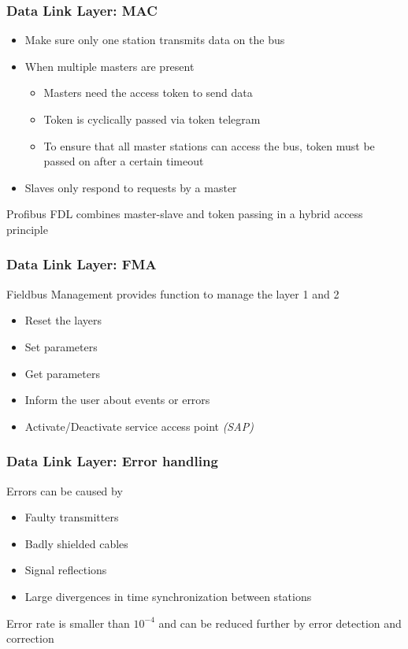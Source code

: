 \documentclass{beamer}
\begin{document}
\begin{frame}
  \frametitle{Data Link Layer: MAC}
  \begin{itemize}
    \item Make sure only one station transmits data on the bus
    \item When multiple masters are present
      \begin{itemize}
        \item Masters need the access token to send data
        \item Token is cyclically passed via token telegram
        \item To ensure that all master stations can access the bus, token must be passed
          on after a certain timeout
      \end{itemize}
    \item Slaves only respond to requests by a master
  \end{itemize}
  Profibus FDL combines master-slave and token passing in a hybrid access principle
\end{frame}

\begin{frame}
  \frametitle{Data Link Layer: FMA}
  Fieldbus Management provides function to manage the layer 1 and 2
    \begin{itemize}
      \item Reset the layers
      \item Set parameters
      \item Get parameters
      \item Inform the user about events or errors
      \item Activate/Deactivate service access point \textit{(SAP)}
    \end{itemize}
\end{frame}

\begin{frame}
  \frametitle{Data Link Layer: Error handling}
  Errors can be caused by
  \begin{itemize}
    \item Faulty transmitters
    \item Badly shielded cables
    \item Signal reflections
    \item Large divergences in time synchronization between stations
  \end{itemize}
  Error rate is smaller than $10^{-4}$ and can be reduced further by error detection and
  correction
\end{frame}
\end{document}
